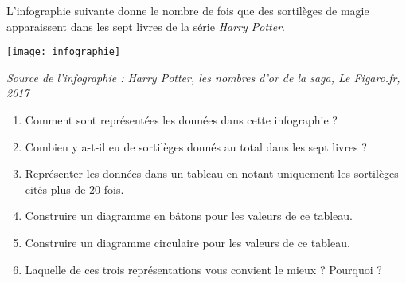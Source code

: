 \begin{colonne*exercice}
\bigskip


\begin{exercice} %
   L'infographie suivante donne le nombre de fois que des sortilèges de magie apparaissent dans les sept livres de la série {\it Harry Potter}.
   \begin{center}
      \texttt{[image: infographie]}
   \end{center}
   {\footnotesize\it Source de l'infographie : Harry Potter, les nombres d'or de la saga, Le Figaro.fr, 2017}
   \begin{enumerate}
      \item Comment sont représentées les données dans cette infographie ?
      \item Combien y a-t-il eu de sortilèges donnés au total dans les sept livres ?
      \item Représenter les données dans un tableau en notant uniquement les sortilèges cités plus de 20 fois.
      \item Construire un diagramme en bâtons pour les valeurs de ce tableau.
      \item Construire un diagramme circulaire pour les valeurs de ce tableau.
      \item Laquelle de ces trois représentations vous convient le mieux ? Pourquoi ?
   \end{enumerate}
\end{exercice}


\end{colonne*exercice}
